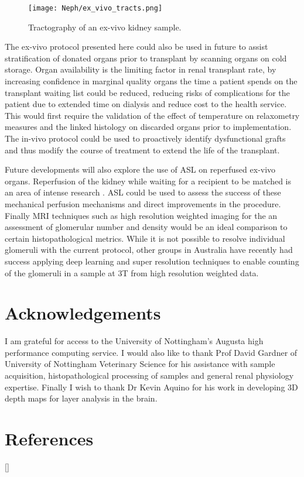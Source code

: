 \begin{figure}[H]
	\centering
	\texttt{[image: Neph/ex\_vivo\_tracts.png]} %
	\caption{Tractography of an ex-vivo kidney sample.}
	\label{fig:ex_ex_tracts}	
\end{figure}

The ex-vivo protocol presented here could also be used in future to assist stratification of donated organs prior to transplant by scanning organs on cold storage. Organ availability is the limiting factor in renal transplant rate, by increasing confidence in marginal quality organs the time a patient spends on the transplant waiting list could be reduced, reducing risks of complications for the patient due to extended time on dialysis and reduce cost to the health service. This would first require the validation of the effect of temperature on relaxometry measures and the linked histology on discarded organs prior to implementation. The in-vivo protocol could be used to proactively identify dysfunctional grafts and thus modify the course of treatment to extend the life of the transplant.

Future developments will also explore the use of \ac{ASL} on reperfused ex-vivo organs. Reperfusion of the kidney while waiting for a recipient to be matched is an area of intense research \cite{bellini_cold_2019,moers_value_2010,wight_pulsatile_2003}. \ac{ASL} could be used to assess the success of these mechanical perfusion mechanisms and direct improvements in the procedure. Finally \ac{MRI} techniques such as high resolution \ttwostar weighted imaging for the an assessment of glomerular number and density would be an ideal comparison to certain histopathological metrics. While it is not possible to resolve individual glomeruli with the current protocol, other groups in Australia have recently had success applying deep learning and super resolution techniques to enable counting of the glomeruli in a sample at 3T from high resolution \ttwostar weighted data.



\section{Acknowledgements}

I am grateful for access to the University of Nottingham's Augusta high performance computing service. I would also like to thank Prof David Gardner of University of Nottingham Veterinary Science for his assistance with sample acquisition, histopathological processing of samples and general renal physiology expertise. Finally I wish to thank Dr Kevin Aquino for his work in developing 3D depth maps for layer analysis in the brain.

\newpage
\section{References}
[\refname]{}
\printbibliography